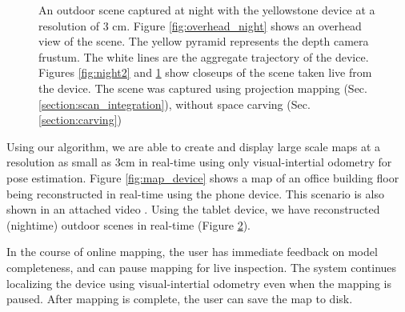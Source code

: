 \documentclass[10pt,twocolumn,letterpaper]{article}
\begin{document}
\begin{figure}
\begin{subfigure}{0.44\columnwidth}
		 \caption{}
		 \label{fig:night3}
	 \end{subfigure} 
	 \caption{An outdoor scene captured at night with the yellowstone device at a
	 resolution of 3 cm. Figure \ref{fig:overhead_night} shows an overhead view of
	 the scene. The yellow pyramid represents the depth camera frustum. The white
	 lines are the aggregate trajectory of the device. Figures \ref{fig:night2}
	 and \ref{fig:night3} show closeups of the scene taken live from the device.
	 The scene was captured using projection mapping (Sec.
	 \ref{section:scan_integration}), without space
	 carving (Sec. \ref{section:carving})}
	 \label{fig:outside}
 \end{figure} 

Using our algorithm, we are able to create and display large scale maps at a
resolution as small as 3cm in real-time using only visual-intertial odometry for pose
estimation. Figure \ref{fig:map_device} shows a map of an office building floor
being reconstructed in real-time using the phone device. This scenario is also
shown in an attached video \cite{TangoVideo}. Using the tablet device, we have
reconstructed (nightime) outdoor scenes in real-time (Figure \ref{fig:outside}).

In the course of online mapping, the user has immediate feedback on model
completeness, and can pause mapping for live inspection. The system continues
localizing the device using visual-intertial odometry even when the mapping is
paused. After mapping is complete, the user can save the map to disk.
 
\end{document}
